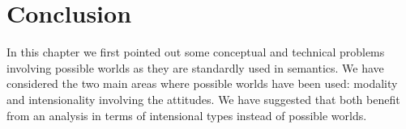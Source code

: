 \section{Conclusion}  

In this chapter we first pointed out some conceptual and technical
problems involving possible worlds as they are standardly used in semantics.
We have considered the two main areas where possible
worlds have been used: modality and intensionality involving the
attitudes.  We have suggested that both benefit from an analysis in
terms of intensional types instead of possible worlds.



